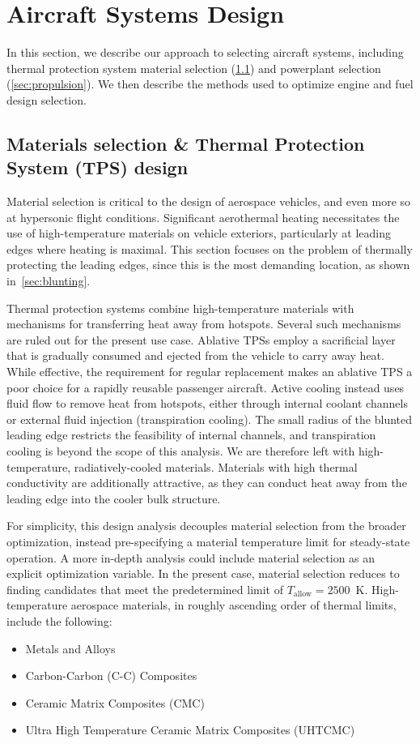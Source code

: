 \documentclass[10pt,a4paper]{article}
\begin{document}
\section{Aircraft Systems Design}\label{sec:design}
In this section, we describe our approach to selecting aircraft systems, including thermal protection system material selection (\cref{sec:TPS}) and powerplant selection (\cref{sec:propulsion}). We then describe the methods used to optimize engine and fuel design selection.

\subsection{Materials selection \& Thermal Protection System (TPS) design}\label{sec:TPS}
Material selection is critical to the design of aerospace vehicles, and even more so at hypersonic flight conditions. Significant aerothermal heating necessitates the use of high-temperature materials on vehicle exteriors, particularly at leading edges where heating is maximal. This section focuses on the problem of thermally protecting the leading edges, since this is the most demanding location, as shown in~\cref{sec:blunting}.

Thermal protection systems combine high-temperature materials with mechanisms for transferring heat away from hotspots. Several such mechanisms are ruled out for the present use case. Ablative TPSs employ a sacrificial layer that is gradually consumed and ejected from the vehicle to carry away heat. While effective, the requirement for regular replacement makes an ablative TPS a poor choice for a rapidly reusable passenger aircraft. Active cooling instead uses fluid flow to remove heat from hotspots, either through internal coolant channels or external fluid injection (transpiration cooling). The small radius of the blunted leading edge restricts the feasibility of internal channels, and transpiration cooling is beyond the scope of this analysis. We are therefore left with high-temperature, radiatively-cooled materials. Materials with high thermal conductivity are additionally attractive, as they can conduct heat away from the leading edge into the cooler bulk structure.

For simplicity, this design analysis decouples material selection from the broader optimization, instead pre-specifying a material temperature limit for steady-state operation. A more in-depth analysis could include material selection as an explicit optimization variable. In the present case, material selection reduces to finding candidates that meet the predetermined limit of $T_{\text{allow}} = 2500$~K. High-temperature aerospace materials, in roughly ascending order of thermal limits, include the following:
\begin{itemize}[noitemsep]
    \item Metals and Alloys
    \item Carbon-Carbon (C-C) Composites
    \item Ceramic Matrix Composites (CMC) 
    \item Ultra High Temperature Ceramic Matrix Composites (UHTCMC)
\end{itemize}
\end{document}
